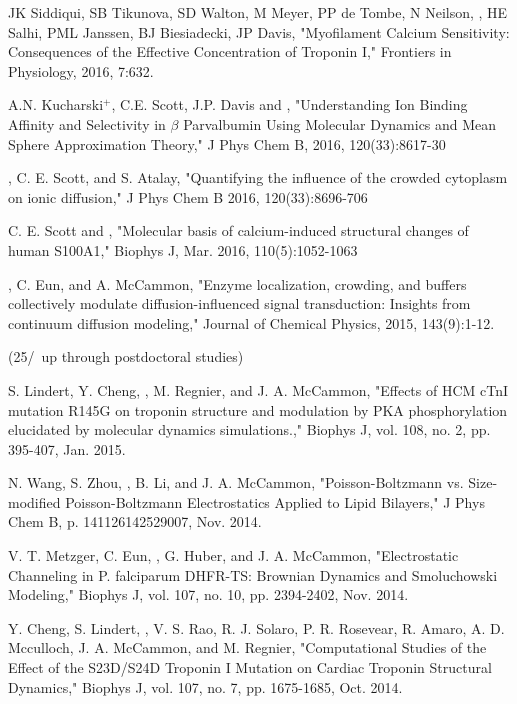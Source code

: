 \begin{etaremune}
\item JK Siddiqui, SB Tikunova, SD Walton, M Meyer, PP de Tombe, N Neilson, \pmkh, HE Salhi, PML Janssen, BJ Biesiadecki, JP Davis, "Myofilament Calcium Sensitivity:  Consequences of the Effective Concentration of Troponin I," Frontiers in Physiology, 2016, 7:632. 
\item A.N. Kucharski$^+$, C.E. Scott, J.P. Davis and \pmkh, "Understanding Ion Binding Affinity and Selectivity in $\beta$ Parvalbumin Using Molecular Dynamics and Mean Sphere Approximation Theory," J Phys Chem B, 2016, 120(33):8617-30 
\item \pmkh, C. E. Scott, and S. Atalay, "Quantifying the influence of the crowded cytoplasm on ionic diffusion," J Phys Chem B 2016, 120(33):8696-706 
\item C. E. Scott and \pmkh, "Molecular basis of calcium-induced structural changes of human S100A1," Biophys J, Mar. 2016, 110(5):1052-1063 
\item \pmkh, C. Eun, and A. McCammon, "Enzyme localization, crowding, and buffers collectively modulate diffusion-influenced signal transduction: Insights from continuum diffusion modeling," Journal of Chemical Physics, 2015, 143(9):1-12. 
\vspace{20pt}
\\
\centerline{ (25/\total\ up through postdoctoral studies)}
\vspace{-10pt}
\item S. Lindert, Y. Cheng, \pmkh, M. Regnier, and J. A. McCammon, "Effects of HCM cTnI mutation R145G on troponin structure and modulation by PKA phosphorylation elucidated by molecular dynamics simulations.," Biophys J, vol. 108, no. 2, pp. 395-407, Jan. 2015. 
\item N. Wang, S. Zhou, \pmkh, B. Li, and J. A. McCammon, "Poisson-Boltzmann vs. Size-modified Poisson-Boltzmann Electrostatics Applied to Lipid Bilayers," J Phys Chem B, p. 141126142529007, Nov. 2014. 
\item V. T. Metzger, C. Eun, \pmkh, G. Huber, and J. A. McCammon, "Electrostatic Channeling in P. falciparum DHFR-TS: Brownian Dynamics and Smoluchowski Modeling," Biophys J, vol. 107, no. 10, pp. 2394-2402, Nov. 2014. 
\item Y. Cheng, S. Lindert, \pmkh, V. S. Rao, R. J. Solaro, P. R. Rosevear, R. Amaro, A. D. Mcculloch, J. A. McCammon, and M. Regnier, "Computational Studies of the Effect of the S23D/S24D Troponin I Mutation on Cardiac Troponin Structural Dynamics," Biophys J, vol. 107, no. 7, pp. 1675-1685, Oct. 2014.

\end{etaremune}
